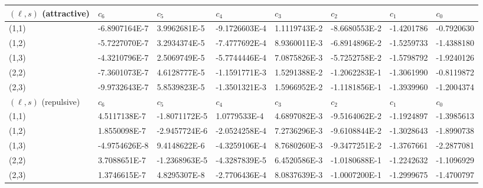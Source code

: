 \documentclass{warpdoc}
\begin{document}
%
\begin{table}[h]
\begin{center}
  \begin{threeparttable}
    \scriptsize
    \begin{tabular*}{\textwidth}{@{\extracolsep{\fill}}llllllll}
\toprule
$(\ell,s)$ (attractive) & $c_6$ & $c_5$ & $c_4$ & $c_3$ & $c_2$ & $c_1$ & $c_0$ \\
\midrule
(1,1) & -6.8907164E-7 & 3.9962681E-5 & -9.1726603E-4 & 1.1119743E-2 & -8.6680553E-2 & -1.4201786  & -0.7920630 \\
(1,2) & -5.7227070E-7 & 3.2934374E-5 & -7.4777692E-4 & 8.9360011E-3 & -6.8914896E-2 & -1.5259733 &  -1.4388180 \\
(1,3) & -4.3210796E-7 & 2.5069749E-5 & -5.7744446E-4 & 7.0875826E-3 & -5.7252758E-2 & -1.5798792  & -1.9240126 \\
(2,2) & -7.3601073E-7 & 4.6128777E-5 & -1.1591771E-3 & 1.5291388E-2 & -1.2062283E-1 & -1.3061990  & -0.8119872 \\
(2,3) & -9.9732643E-7 & 5.8539823E-5 & -1.3501321E-3 & 1.5966952E-2 & -1.1181856E-1 & -1.3939960  & -1.2004374 \\
\midrule
$(\ell,s)$ (repulsive) & $c_6$ & $c_5$ & $c_4$ & $c_3$ & $c_2$ & $c_1$ & $c_0$ \\
\midrule
(1,1) & 4.5117138E-7 & -1.8071172E-5 & 1.0779533E-4 & 4.6897082E-3 & -9.5164062E-2 & -1.1924897  & -1.3985613 \\
(1,2) & 1.8550098E-7 & -2.9457724E-6 & -2.0524258E-4 & 7.2736296E-3 & -9.6108844E-2 & -1.3028643  & -1.8990738 \\
(1,3) & -4.9754626E-8 & 9.4148622E-6 & -4.3259106E-4 & 8.7680260E-3 & -9.3477251E-2 & -1.3767661  & -2.2877081 \\
(2,2) & 3.7088651E-7 & -1.2368963E-5 & -4.3287839E-5 & 6.4520586E-3 & -1.0180688E-1 & -1.2242632  & -1.1096929 \\
(2,3) & 1.3746615E-7 & 4.8295307E-8 & -2.7706436E-4 & 8.0837639E-3 & -1.0007200E-1 & -1.2999675  & -1.4700797 \\
\bottomrule
    \end{tabular*}
    \label{tab:chargedparticlecollision}
  \end{threeparttable}
\end{center}
\end{table}
%
\end{document}
